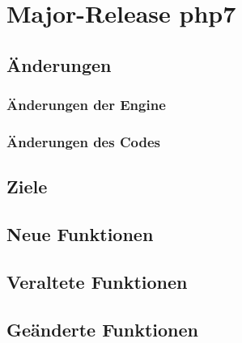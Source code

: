 \chapter{Major-Release php7}\label{ch:php7}

\section{Änderungen}
\subsection{Änderungen der Engine}
\subsection{Änderungen des Codes}

\section{Ziele}

\section{Neue Funktionen}

\section{Veraltete Funktionen}

\section{Geänderte Funktionen}
